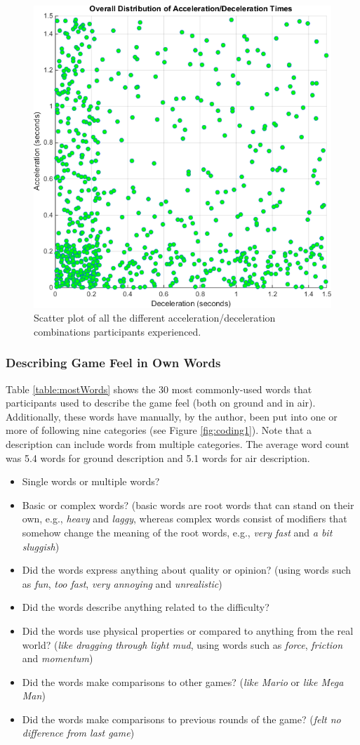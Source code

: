 \begin{figure}[htbp]
\centering
\includegraphics[width=0.7\columnwidth]{Pics/Classes/overall_distribution}
\caption{Scatter plot of all the different acceleration/deceleration combinations participants experienced.}
\label{fig:overallDistribution}
\end{figure}

\subsubsection{Describing Game Feel in Own Words}
Table \ref{table:mostWords} shows the 30 most commonly-used words that participants used to describe the game feel (both on ground and in air). Additionally, these words have manually, by the author, been put into one or more of following nine categories (see Figure \ref{fig:coding1}). Note that a description can include words from multiple categories. The average word count was 5.4 words for ground description and 5.1 words for air description.
\begin{itemize}[noitemsep,nolistsep]
\item Single words or multiple words?
\item Basic or complex words? (basic words are root words that can stand on their own, e.g., \textit{heavy} and \textit{laggy}, whereas complex words consist of modifiers that somehow change the meaning of the root words, e.g., \textit{very fast} and \textit{a bit sluggish})
\item Did the words express anything about quality or opinion? (using words such as \textit{fun}, \textit{too fast}, \textit{very annoying} and \textit{unrealistic})
\item Did the words describe anything related to the difficulty?
\item Did the words use physical properties or compared to anything from the real world? (\textit{like dragging through light mud}, using words such as \textit{force}, \textit{friction} and \textit{momentum})
\item Did the words make comparisons to other games? (\textit{like Mario} or \textit{like Mega Man})
\item Did the words make comparisons to previous rounds of the game? (\textit{felt no difference from last game})
\end{itemize}

